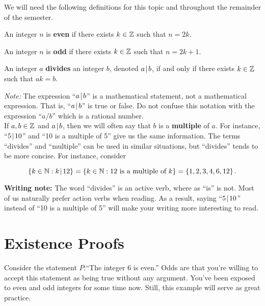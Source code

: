 We will need the following definitions for this topic and throughout the remainder of the semester.

\begin{definition}[Even] An integer $n$ is \textbf{even} if there exists $k \in \mathbb{Z}$ such that  $n= 2k$.
\end{definition}

\begin{definition}[Odd] An integer $n$ is \textbf{odd} if there exists $k \in \mathbb{Z}$ such that $n=2k+1$.
\end{definition}

\begin{definition}[Divides] An integer $a$ \textbf{divides} an integer $b$, denoted $a \! \mid \! b$, if and only if there exists $k \in \mathbb{Z}$ such that $ak=b$.
\end{definition}

\noindent \textit{Note:} The expression ``$a \! \mid \! b$'' is a mathematical statement, not a mathematical expression.  That is, ``$a \! \mid \! b$'' is true or false.  Do not confuse this notation with the expression ``$a/b$'' which is a rational number.\\

\noindent  If $a,b \in \mathbb{Z}$ and $a \! \mid \! b$, then we will often say that $b$ is a \textbf{multiple} of $a$.  For instance, ``$5 \! \mid \! 10$'' and ``10 is a multiple of 5'' give us the same information.  The terms ``divides'' and ``multiple'' can be used in similar situations, but ``divides'' tends to be more concise.  For instance, consider

\[\left\{k \in \mathbb{N} : k \! \mid \! 12\right\} = \left\{k \in \mathbb{N} : 12 \ \text{is a multiple of }k\right\} = \left\{1,2,3,4,6,12\right\}.\]

\noindent \textbf{Writing note:}  The word ``divides'' is an active verb, where as ``is'' is not.  Most of us naturally prefer action verbs when reading.  As a result, saying ``$5 \! \mid \! 10$'' instead of ``10 is a multiple of 5'' will make your writing more interesting to read.\\

\section{Existence Proofs}

\noindent Consider the statement $P$:``The integer 6 is even.''  Odds are that you're willing to accept this statement as being true without any argument.  You've been exposed to even and odd integers for some time now.  Still, this example will serve as great practice.  \\

